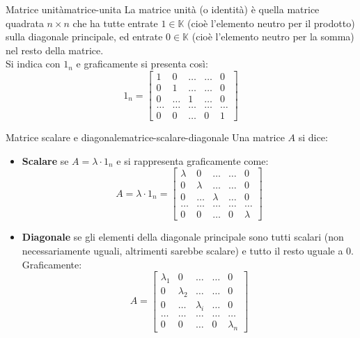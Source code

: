 \documentclass[12pt]{report}
\newcommand{\K}{\mathbb{K}}
\begin{document}
	\begin{definizione}{Matrice unità}{matrice-unita}
		La matrice unità (o identità) è quella matrice quadrata $n \times n$ che ha tutte entrate $1 \in \K$ (cioè l'elemento neutro per il prodotto) sulla diagonale principale, ed entrate $0 \in \K$ (cioè l'elemento neutro per la somma) nel resto della matrice.\\
		Si indica con $1_n$ e graficamente si presenta così:
		\[
			1_n = 
			\begin{bmatrix}
				1 & 0 & \dots & \dots & 0\\
				0 & 1 & \dots & \dots & 0\\
				0 & \dots & 1 & \dots & 0\\
				\dots & \dots & \dots & \dots & \dots\\
				0 & 0 & \dots & 0 & 1
			\end{bmatrix}
		\]
	\end{definizione}
	
	\begin{definizione}{Matrice scalare e diagonale}{matrice-scalare-diagonale}
		Una matrice $A$ si dice:
		\begin{itemize}
			\item \textbf{Scalare} se $A = \lambda \cdot 1_n$ e si rappresenta graficamente come:
			\[
				A = \lambda \cdot 1_n = 
				\begin{bmatrix}
					\lambda & 0 & \dots & \dots & 0\\
					0 & \lambda & \dots & \dots & 0\\
					0 & \dots & \lambda & \dots & 0\\
					\dots & \dots & \dots & \dots & \dots\\
					0 & 0 & \dots & 0 & \lambda
				\end{bmatrix}
			\]
			
			\item \textbf{Diagonale} se gli elementi della diagonale principale sono tutti scalari (non necessariamente uguali, altrimenti sarebbe scalare) e tutto il resto uguale a $0$.\\
			Graficamente:
			\[
				A = 
				\begin{bmatrix}
					\lambda_1 & 0 & \dots & \dots & 0\\
					0 & \lambda_2 & \dots & \dots & 0\\
					0 & \dots & \lambda_i & \dots & 0\\
					\dots & \dots & \dots & \dots & \dots\\
					0 & 0 & \dots & 0 & \lambda_n
				\end{bmatrix}
			\]
		\end{itemize}
	\end{definizione}
	
\end{document}
